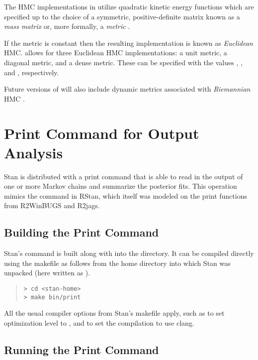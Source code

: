 The HMC implementations in \Stan utilize quadratic kinetic energy
functions which are specified up to the choice of a symmetric,
positive-definite matrix known as a \textit{mass matrix} or, more
formally, a \textit{metric} \citep{Betancourt-Stein:2011}.

If the metric is constant then the resulting implementation is known
as \textit{Euclidean} HMC.  \Stan allows for three Euclidean HMC
implementations: a unit metric, a diagonal metric, and a dense
metric.  These can be specified with the values ,
, and , respectively.

Future versions of \Stan will also include dynamic metrics associated
with \textit{Riemannian} HMC \citep{GirolamiCalderhead:2011, Betancourt:2012}.

\chapter{Print Command for Output Analysis}\label{print-command.chapter}

Stan is distributed with a print command that is able to read in the
output of one or more Markov chains and summarize the posterior fits.
This operation mimics the  command in RStan, which
itself was modeled on the print functions from R2WinBUGS and R2jags.

\section{Building the Print Command}

Stan's  command is built along with  into the
 directory.  It can be compiled directly using the makefile
as follows from the home directory into which Stan was unpacked (here
written as ).
%
\begin{quote}
\begin{Verbatim}[fontsize=\small]
> cd <stan-home>
> make bin/print
\end{Verbatim}
\end{quote}
%
All the usual compiler options from Stan's makefile apply, such as
 to set optimization level to , and
 to set the compilation to use clang. 

\section{Running the Print Command}

